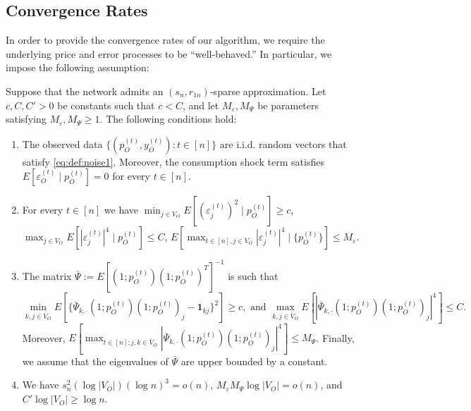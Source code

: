 \documentclass[opre,nonblindrev]{informs3} %
\def\Pk{\bar{\Psi}_{k,\cdot} }
\begin{document}
\subsection{Convergence Rates}\label{subse:estimationBounds}

In order to provide the convergence rates of our algorithm, we
require the underlying price
and error processes
to be ``well-behaved.''
In particular, we impose the following assumption:
\begin{assumption}\label{assumption:basicRandom}
	Suppose that the network  admits an 
	$(s_n,r_{1n})$-sparse 
	approximation.
	Let $c,C,C'>0$ be  constants such that $c<C$,
	and let
	$M_\varepsilon, M_\Psi$ be parameters satisfying
	$M_\varepsilon, M_\Psi \geq 1 $.
	The following conditions hold:
	{
		\begin{enumerate}[label=\roman*.]
			\item
			The observed data $\{ ({p}^{(t)}_O, {y}_O^{(t)}) : t\in [n]\}$ are i.i.d. random vectors
			that satisfy \eqref{eq:def:noise1}.
			Moreover, the consumption shock term satisfies ${E}[{\varepsilon}^{(t)}_O \mid  {p}^{(t)}_O ] = 0$ for every $t\in[n]$.
			\label{ass3.1}
			\item
			For every $t\in[n]$ we have
			$\min_{j\in V_O} E[(\varepsilon_j^{(t)})^2 \mid p_O^{(t)}] \geq c$, $\max_{j\in V_O}E[|\varepsilon_j^{(t)}|^4\mid p_O^{(t)}] \leq C$,
			$E[\max_{t\in[n],j\in V_O} |\varepsilon_j^{(t)}|^4  \mid \{p_O^{(t)}\}]\leq M_\varepsilon$.
			\label{ass3.2}
			
			\item
			The matrix $\bar \Psi:=E[(1;p_O^{(t)})(1;p_O^{(t)})^T]^{-1}$ is such that
			$$\min_{k,j\in \bar V_O}E[ \{ \Pk(1;p_O^{(t)})(1;p_O^{(t)})_j - \mathbf{1}_{kj}\}^2] \geq c, \mbox{ and } \max_{k,j \in \bar V_O} E[ | \Pk(1;p_O^{(t)})(1;p_O^{(t)})_j|^4] \leq C.$$
			Moreover,
			$E[ \max_{t\in [n]; j,k\in \bar V_O} |  \Pk(1;p_O^{(t)})(1;p_O^{(t)})_j|^4 ] \leq M_\Psi$.
			Finally, we assume that the eigenvalues of $\bar \Psi$ are upper bounded by a constant.
			\label{ass3.3}

			 
			\item
			We have $ s_n^2(\log |V_O|) (\log n)^3  = o(n)	$,
			$M_\varepsilon M_\Psi   \log |V_O| = o(n)$,
			and
			$ C' \log |V_O| \geq  \log n$.
			\label{ass3.5}
		\end{enumerate}
	}
	
	
\end{assumption}
\end{document}

